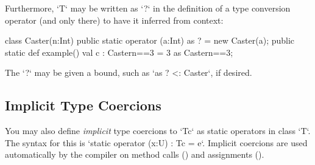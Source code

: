 Furthermore, \xcd`T` may be written as \xcd`?` in the definition of a type
conversion operator (and only there) to have it inferred from context: 

\begin{xten}
class Caster(n:Int) {
  public static operator (a:Int) as ? = new Caster(a); 
  public static def example() {
    val c : Caster{n==3} = 3 as Caster{n==3};
  }
}
\end{xten}
%


The \xcd`?` may be given a bound, such as \xcd`as ? <: Caster`, if desired.



\subsection{Implicit Type Coercions}
\label{sect:ImplicitCoercion}

You may also define {\em implicit} type coercions to \xcd`T{c}` as static
operators in class \xcd`T`.  The syntax for this is
\xcd`static operator (x:U) : T{c} = e`.
Implicit coercions are used automatically by the compiler on method calls 
() and assignments ().



